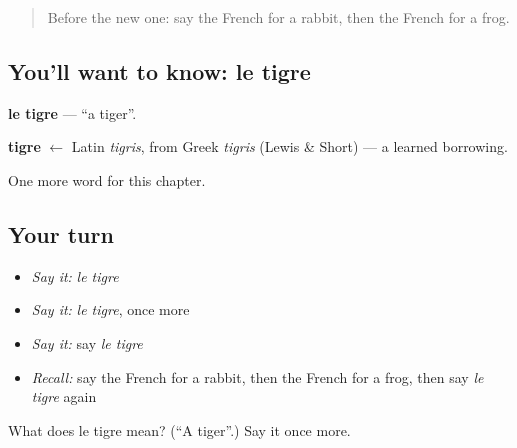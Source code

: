 \label{lesson:FR-C88-tigre}



\begin{quote}
Before the new one: say the French for a rabbit, then the French for a frog.
\end{quote}

\subsection*{You'll want to know: le tigre}
\textbf{le tigre} — \textquotedblleft{}a tiger\textquotedblright{}.

\begin{cousinweb}
\textbf{tigre} $\leftarrow$ Latin \emph{tigris}, from Greek \emph{tigris} (Lewis \& Short) — a learned borrowing.
\end{cousinweb}

\begin{grammarlens}[title={What you've built}]
One more word for this chapter.
\end{grammarlens}

\subsection*{Your turn}
\begin{itemize}
\raggedright
  \item \emph{Say it:} \emph{le tigre}
  \item \emph{Say it:} \emph{le tigre}, once more
  \item \emph{Say it:} say \emph{le tigre}
  \item \emph{Recall:} say the French for a rabbit, then the French for a frog, then say \emph{le tigre} again
\end{itemize}

\begin{tcolorbox}[breakable,colback=teal!4,colframe=teal!35!black,title={Before you move on}]
What does le tigre mean? (\textquotedblleft{}A tiger\textquotedblright{}.) Say it once more.
\end{tcolorbox}
